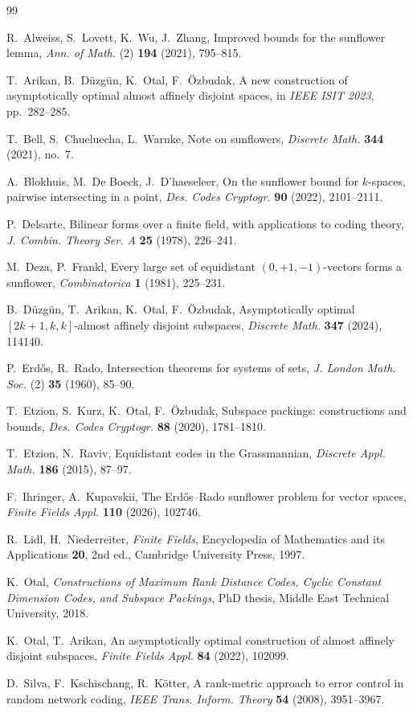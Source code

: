 \documentclass[11pt]{article}
\theoremstyle{definition}
\begin{document}
\begin{thebibliography}{99}

 R.~Alweiss, S.~Lovett, K.~Wu, J.~Zhang, Improved bounds for the sunflower lemma, \emph{Ann. of Math.} (2) \textbf{194} (2021), 795--815.

 T.~Arikan, B.~D\"uzg\"un, K.~Otal, F.~\"Ozbudak, A new construction of asymptotically optimal almost affinely disjoint spaces, in \emph{IEEE ISIT 2023}, pp.~282--285.

 T.~Bell, S.~Chueluecha, L.~Warnke, Note on sunflowers, \emph{Discrete Math.} \textbf{344} (2021), no.~7.

 A.~Blokhuis, M.~De Boeck, J.~D'haeseleer, On the sunflower bound for $k$-spaces, pairwise intersecting in a point, \emph{Des. Codes Cryptogr.} \textbf{90} (2022), 2101--2111.

 P.~Delsarte, Bilinear forms over a finite field, with applications to coding theory, \emph{J. Combin. Theory Ser. A} \textbf{25} (1978), 226--241.

 M.~Deza, P.~Frankl, Every large set of equidistant $(0, +1, -1)$-vectors forms a sunflower, \emph{Combinatorica} \textbf{1} (1981), 225--231.

 B.~D\"uzg\"un, T.~Arikan, K.~Otal, F.~\"Ozbudak, Asymptotically optimal $[2k+1, k, k]$-almost affinely disjoint subspaces, \emph{Discrete Math.} \textbf{347} (2024), 114140.

 P.~Erd\H{o}s, R.~Rado, Intersection theorems for systems of sets, \emph{J. London Math. Soc.} (2) \textbf{35} (1960), 85--90.

 T.~Etzion, S.~Kurz, K.~Otal, F.~\"Ozbudak, Subspace packings: constructions and bounds, \emph{Des. Codes Cryptogr.} \textbf{88} (2020), 1781--1810.

 T.~Etzion, N.~Raviv, Equidistant codes in the Grassmannian, \emph{Discrete Appl. Math.} \textbf{186} (2015), 87--97.

 F.~Ihringer, A.~Kupavskii, The Erd\H{o}s--Rado sunflower problem for vector spaces, \emph{Finite Fields Appl.} \textbf{110} (2026), 102746.

 R.~Lidl, H.~Niederreiter, \emph{Finite Fields}, Encyclopedia of Mathematics and its Applications \textbf{20}, 2nd ed., Cambridge University Press, 1997.

 K.~Otal, \emph{Constructions of Maximum Rank Distance Codes, Cyclic Constant Dimension Codes, and Subspace Packings}, PhD thesis, Middle East Technical University, 2018.

 K.~Otal, T.~Arikan, An asymptotically optimal construction of almost affinely disjoint subspaces, \emph{Finite Fields Appl.} \textbf{84} (2022), 102099.

 D.~Silva, F.~Kschischang, R.~K\"otter, A rank-metric approach to error control in random network coding, \emph{IEEE Trans. Inform. Theory} \textbf{54} (2008), 3951--3967.

\end{thebibliography}
\end{document}
